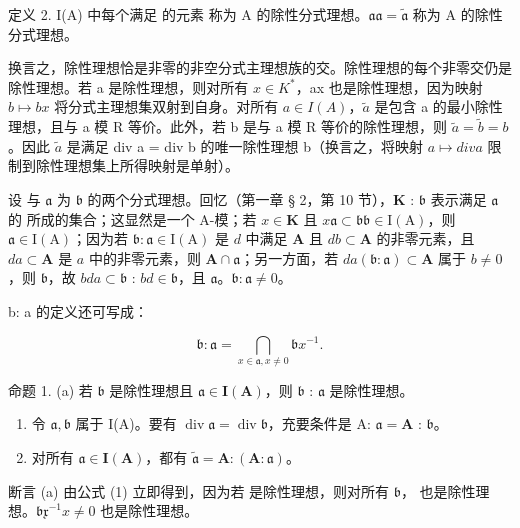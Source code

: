 定义 2. I(A) 中每个满足  的元素  称为 A 的除性分式理想。\(\mathfrak{a}\)\(\mathfrak{a} = \tilde{\mathfrak{a}}\) 称为 A 的除性分式理想。

换言之，除性理想恰是非零的非空分式主理想族的交。除性理想的每个非零交仍是除性理想。若 a 是除性理想，则对所有 \(x \in K^{*}\)，ax 也是除性理想，因为映射 \(b \mapsto bx\) 将分式主理想集双射到自身。对所有 \(a \in I(A)\)，\(\tilde{a}\) 是包含 a 的最小除性理想，且与 a 模 R 等价。此外，若 b 是与 a 模 R 等价的除性理想，则 \(\tilde{a} = \tilde{b} = b\)。因此 \(\tilde{a}\) 是满足 div a = div b 的唯一除性理想 b（换言之，将映射 \(a \mapsto div a\) 限制到除性理想集上所得映射是单射）。

设  与 \(\mathfrak{a}\) 为 \(\mathfrak{b}\) 的两个分式理想。回忆（第一章 § 2，第 10 节），\(\mathbf{K}\) : \(\mathfrak{b}\) 表示满足 \(\mathfrak{a}\) 的  所成的集合；这显然是一个 A-模；若 \(x \in \mathbf{K}\) 且 \(x\mathfrak{a} \subset \mathfrak{b}\)\(\mathfrak{b} \in \mathrm{I}(\mathrm{A})\)，则 \(\mathfrak{a} \in \mathrm{I}(\mathrm{A})\)；因为若 \(\mathfrak{b} \colon \mathfrak{a} \in \mathrm{I}(\mathrm{A})\) 是 \(d\) 中满足 \(\mathbf{A}\) 且 \(db \subset \mathbf{A}\) 的非零元素，且 \(da \subset \mathbf{A}\) 是 \(a\) 中的非零元素，则 \(\mathbf{A} \cap \mathfrak{a}\)；另一方面，若 \(da(\mathfrak{b} : \mathfrak{a}) \subset \mathbf{A}\) 属于 \(b \neq 0\)，则 \(\mathfrak{b}\)，故 \(bda \subset \mathfrak{b}\) : \(bd \in \mathfrak{b}\)，且 \(\mathfrak{a}\)。\(\mathfrak{b} : \mathfrak{a} \neq 0\)。

b: a 的定义还可写成：

\[
\mathfrak {b}: \mathfrak {a} = \bigcap_ {x \in \mathfrak {a}, x \neq 0} \mathfrak {b} x ^ {- 1}.\tag{1}
\]

命题 1. (a) 若 \(\mathfrak{b}\) 是除性理想且 \(\mathfrak{a} \in \mathbf{I}(\mathbf{A})\)，则 \(\mathfrak{b}\) : \(\mathfrak{a}\) 是除性理想。

\begin{enumerate}
\def\labelenumi{(\alph{enumi})}
\setcounter{enumi}{1}
\item
令 \(\mathfrak{a},\mathfrak{b}\) 属于 I(A)。要有 \(\operatorname {div}\mathfrak{a} = \operatorname {div}\mathfrak{b}\)，充要条件是 A: \(\mathfrak{a} = \mathbf{A}\) : \(\mathfrak{b}\)。
\item
对所有 \(\mathfrak{a} \in \mathbf{I}(\mathbf{A})\)，都有 \(\tilde{\mathfrak{a}} = \mathbf{A} : (\mathbf{A} : \mathfrak{a})\)。
\end{enumerate}

断言 (a) 由公式 (1) 立即得到，因为若  是除性理想，则对所有 \(\mathfrak{b}\)， 也是除性理想。\(\mathfrak{bx}^{-1}\)\(x \neq 0\) 也是除性理想。

